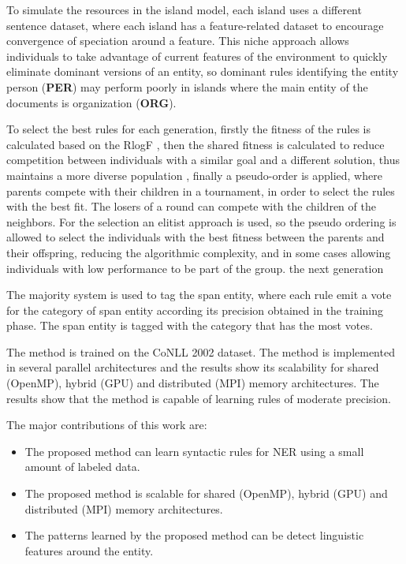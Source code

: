 \documentclass{IEEEtran}
\begin{document}
To simulate the resources in the island model, each island uses a different sentence dataset, where each island has a feature-related dataset to encourage convergence of speciation around a feature. This niche approach allows individuals to take advantage of current features of the environment to quickly eliminate dominant versions of an entity, so dominant rules identifying the entity person (\textbf{PER}) may perform poorly in islands where the main entity of the documents is organization (\textbf{ORG}).

To select the best rules for each generation, firstly the fitness of the rules is calculated based on the RlogF \cite{seman_lex} , then the shared fitness is calculated to reduce competition between individuals with a similar goal and a different solution, thus maintains a more diverse population \cite{goldber_mul}, finally a pseudo-order is applied, where parents compete with their children in a tournament, in order to select the rules with the best fit. The losers of a round can compete with the children of the neighbors. For the selection an elitist approach is used, so the pseudo ordering is allowed to select the individuals with the best fitness between the parents and their offspring, reducing the algorithmic complexity, and in some cases allowing individuals with low performance to be part of the group. the next generation

The majority system is used to tag the span entity, where each rule emit a vote for the category of span entity according its precision obtained in the training phase. The span entity is tagged with the category that has the most votes.

The method is trained on the CoNLL 2002 \cite{tjong-kim-sang-2002-introduction} dataset. The method is implemented in several parallel architectures and the results show its scalability for shared (OpenMP), hybrid (GPU) and distributed (MPI) memory architectures. The results show that the method is capable of learning rules of moderate precision.

The major contributions of this work are:
\begin{itemize}
  \item The proposed method can learn syntactic rules for NER using a small amount of labeled data.
  \item The proposed method is scalable for shared (OpenMP), hybrid (GPU) and distributed (MPI) memory architectures.
  \item The patterns learned by the proposed method can be detect linguistic features around the entity.
\end{itemize}
\end{document}
